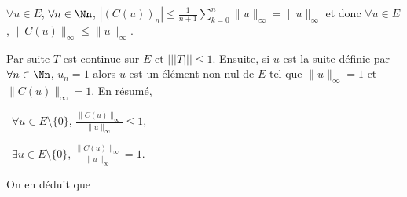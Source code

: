 {{\begin{center}
$\forall u\in E$, $\forall n\in\Nn$, $\left|(C(u))_n\right|\leqslant \frac{1}{n+1}\sum_{k=0}^{n}\|u\|_\infty =\|u\|_\infty$ et donc $\forall u\in E$, $\|C(u)\|_\infty\leqslant\|u\|_\infty$.
\end{center}

Par suite $T$ est continue sur $E$ et $|||T|||\leqslant1$. Ensuite, si $u$ est la suite définie par $\forall n\in\Nn$, $u_n = 1$ alors $u$ est un élément non nul de $E$ tel que $\|u\|_\infty=1$ et $\|C(u)\|_\infty=1$. En résumé,

\textbullet~$\forall u\in E\setminus\{0\}$, $ \frac{\|C(u)\|_\infty}{\|u\|_\infty}\leqslant1$,

\textbullet~$\exists u\in E\setminus\{0\}$, $ \frac{\|C(u)\|_\infty}{\|u\|_\infty}=1$.

On en déduit que

\begin{center}
\end{center}
}
}
